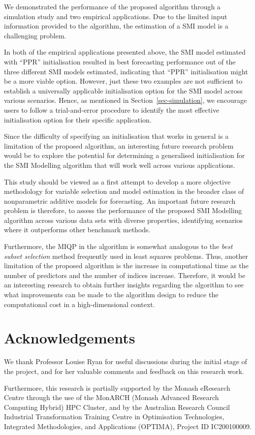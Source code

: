 \documentclass[
  11pt,
  a4paper,
]{article}
\begin{document}
We demonstrated the performance of the proposed algorithm through a
simulation study and two empirical applications. Due to the limited
input information provided to the algorithm, the estimation of a SMI
model is a challenging problem.

In both of the empirical applications presented above, the SMI model
estimated with ``PPR'' initialisation resulted in best forecasting
performance out of the three different SMI models estimated, indicating
that ``PPR'' initialisation might be a more viable option. However, just
these two examples are not sufficient to establish a universally
applicable initialisation option for the SMI model across various
scenarios. Hence, as mentioned in Section~\ref{sec-simulation}, we
encourage users to follow a trial-and-error procedure to identify the
most effective initialisation option for their specific application.

Since the difficulty of specifying an initialisation that works in
general is a limitation of the proposed algorithm, an interesting future
research problem would be to explore the potential for determining a
generalised initialisation for the SMI Modelling algorithm that will
work well across various applications.

This study should be viewed as a first attempt to develop a more
objective methodology for variable selection and model estimation in the
broader class of nonparametric additive models for forecasting. An
important future research problem is therefore, to assess the
performance of the proposed SMI Modelling algorithm across various data
sets with diverse properties, identifying scenarios where it outperforms
other benchmark methods.

Furthermore, the MIQP in the algorithm is somewhat analogous to the
\emph{best subset selection} method frequently used in least squares
problems. Thus, another limitation of the proposed algorithm is the
increase in computational time as the number of predictors and the
number of indices increase. Therefore, it would be an interesting
research to obtain further insights regarding the algorithm to see what
improvements can be made to the algorithm design to reduce the
computational cost in a high-dimensional context.

\section*{Acknowledgements}\label{acknowledgements}

We thank Professor Louise Ryan for useful discussions during the initial
stage of the project, and for her valuable comments and feedback on this
research work.

Furthermore, this research is partially supported by the Monash
eResearch Centre through the use of the MonARCH (Monash Advanced
Research Computing Hybrid) HPC Cluster, and by the Australian Research
Council Industrial Transformation Training Centre in Optimisation
Technologies, Integrated Methodologies, and Applications (OPTIMA),
Project ID IC200100009.


\printbibliography
\end{document}
